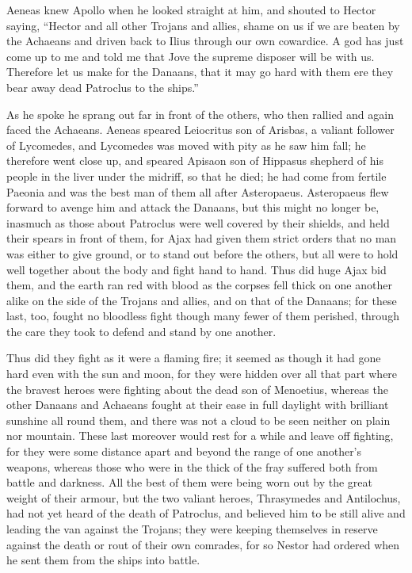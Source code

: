 Aeneas knew Apollo when he looked straight at him, and shouted to Hector
saying, “Hector and all other Trojans and allies, shame on us if we are
beaten by the Achaeans and driven back to Ilius through our own cowardice.
A god has just come up to me and told me that Jove the supreme disposer
will be with us. Therefore let us make for the Danaans, that it may go
hard with them ere they bear away dead Patroclus to the ships.”

As he spoke he sprang out far in front of the others, who then rallied and
again faced the Achaeans. Aeneas speared Leiocritus son of Arisbas, a
valiant follower of Lycomedes, and Lycomedes was moved with pity as he saw
him fall; he therefore went close up, and speared Apisaon son of Hippasus
shepherd of his people in the liver under the midriff, so that he died; he
had come from fertile Paeonia and was the best man of them all after
Asteropaeus. Asteropaeus flew forward to avenge him and attack the
Danaans, but this might no longer be, inasmuch as those about Patroclus
were well covered by their shields, and held their spears in front of
them, for Ajax had given them strict orders that no man was either to give
ground, or to stand out before the others, but all were to hold well
together about the body and fight hand to hand. Thus did huge Ajax bid
them, and the earth ran red with blood as the corpses fell thick on one
another alike on the side of the Trojans and allies, and on that of the
Danaans; for these last, too, fought no bloodless fight though many fewer
of them perished, through the care they took to defend and stand by one
another.

Thus did they fight as it were a flaming fire; it seemed as though it had
gone hard even with the sun and moon, for they were hidden over all that
part where the bravest heroes were fighting about the dead son of
Menoetius, whereas the other Danaans and Achaeans fought at their ease in
full daylight with brilliant sunshine all round them, and there was not a
cloud to be seen neither on plain nor mountain. These last moreover would
rest for a while and leave off fighting, for they were some distance apart
and beyond the range of one another’s weapons, whereas those who were in
the thick of the fray suffered both from battle and darkness. All the best
of them were being worn out by the great weight of their armour, but the
two valiant heroes, Thrasymedes and Antilochus, had not yet heard of the
death of Patroclus, and believed him to be still alive and leading the van
against the Trojans; they were keeping themselves in reserve against the
death or rout of their own comrades, for so Nestor had ordered when he
sent them from the ships into battle.

